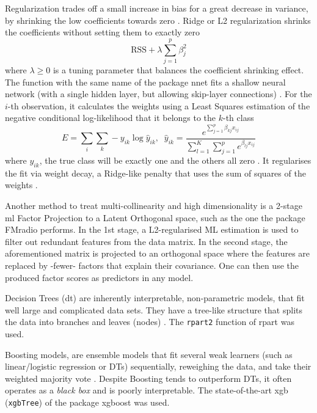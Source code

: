 \documentclass{amsart}
\begin{document}
Regularization trades off a small increase in bias for a great decrease in variance, by shrinking the low coefficients towards zero \cite{James2023AnEdition}. Ridge or L2 regularization \cite{Cessie1992RidgeRegression} shrinks the coefficients without setting them to exactly zero \cite{Cessie1992RidgeRegression}
\[\textrm{RSS} + \lambda\sum_{j=1}^{p}\beta_j^2 \]where $\lambda \geq 0$ is a tuning parameter that balances the coefficient shrinking effect. The function with the same name of the package \textsf{nnet} fits a shallow neural network (with a single hidden layer, but allowing skip-layer connections) \cite{nnet}. For the $i$-th observation, it calculates the weights using a Least Squares estimation of the negative conditional log-likelihood that it belongs to the $k$-th class
\[E = \sum_{i}\sum_{k}-y_{ik}\log\hat{y}_{ik}, \; \;  \hat{y}_{ik} =  \dfrac{e^{\sum_{j=1}^{p}\beta_{kj}x_{ij}}}{\sum_{l=1}^{K}\sum_{j=1}^{p}e^{\beta_{lj}x_{ij}}}\]
where $y_{ik}$, the true class will be exactly one and the others all zero \cite{nnet}. It regularises the fit via weight decay, a Ridge-like penalty that uses the sum of squares of the weights \cite{nnet}.

Another method to treat multi-collinearity and high dimensionality is a 2-stage \acrfull{ml} Factor Projection to a Latent Orthogonal space, such as the one the package \textsf{FMradio} \cite{Peeters2019StableData} performs. In the 1st stage, a L2-regularised ML estimation is used to filter out redundant features from the data matrix. In the second stage, the aforementioned matrix is projected to an orthogonal space where the features are replaced by -fewer- factors that explain their covariance. One can then use the produced factor scores as predictors in any model.

Decision Trees (\acrshort{dt}) are inherently interpretable, non-parametric models, that fit well large and complicated data sets. They have a tree-like structure that splits the data into branches and leaves (nodes) \cite{Song2015DecisionPrediction}. The \texttt{rpart2} \cite{rpart} function of \textsf{rpart} was used.

Boosting models, are ensemble models that fit several weak learners (such as linear/logistic regression or DTs) sequentially, reweighing the data, and take their weighted majority vote \cite{Friedman2000boosting,Friedman2001gbm}. Despite Boosting tends to outperform DTs, it often operates as a \textit{black box} and is poorly interpretable. The state-of-the-art \acrlong{xgb} (\texttt{xgbTree}) of the package \textsf{xgboost} \cite{Chen2016XGBoost:System} was used.
\end{document}
